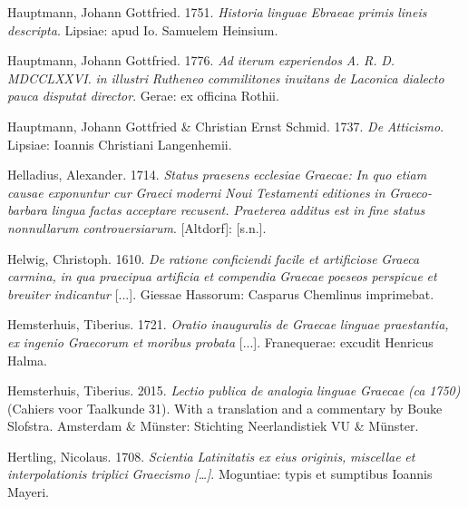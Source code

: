 Hauptmann, Johann Gottfried. 1751. \textit{Historia} \textit{linguae} \textit{Ebraeae} \textit{primis} \textit{lineis} \textit{descripta}. Lipsiae: apud Io. Samuelem Heinsium.

Hauptmann, Johann Gottfried. 1776. \textit{Ad} \textit{iterum} \textit{experiendos} \textit{A.} \textit{R.} \textit{D.} \textit{MDCCLXXVI.} \textit{in} \textit{illustri} \textit{Rutheneo} \textit{commilitones} \textit{inuitans} \textit{de} \textit{Laconica} \textit{dialecto} \textit{pauca} \textit{disputat} \textit{director}. Gerae: ex officina Rothii.

Hauptmann, Johann Gottfried \& Christian Ernst Schmid. 1737. \textit{De} \textit{Atticismo}. Lipsiae: Ioannis Christiani Langenhemii.

Helladius, Alexander. 1714. \textit{Status} \textit{praesens} \textit{ecclesiae} \textit{Graecae:} \textit{In} \textit{quo} \textit{etiam} \textit{causae} \textit{exponuntur} \textit{cur} \textit{Graeci} \textit{moderni} \textit{Noui} \textit{Testamenti} \textit{editiones} \textit{in} \textit{Graeco-barbara} \textit{lingua} \textit{factas} \textit{acceptare} \textit{recusent.} \textit{Praeterea} \textit{additus} \textit{est} \textit{in} \textit{fine} \textit{status} \textit{nonnullarum} \textit{controuersiarum}. [Altdorf]: [s.n.].

Helwig, Christoph. 1610. \textit{De} \textit{ratione} \textit{conficiendi} \textit{facile} \textit{et} \textit{artificiose} \textit{Graeca} \textit{carmina,} \textit{in} \textit{qua} \textit{praecipua} \textit{artificia} \textit{et} \textit{compendia} \textit{Graecae} \textit{poeseos} \textit{perspicue} \textit{et} \textit{breuiter} \textit{indicantur} [...]. Giessae Hassorum: Casparus Chemlinus imprimebat.

Hemsterhuis, Tiberius. 1721. \textit{Oratio} \textit{inauguralis} \textit{de} \textit{Graecae} \textit{linguae} \textit{praestantia,} \textit{ex} \textit{ingenio} \textit{Graecorum} \textit{et} \textit{moribus} \textit{probata} [...]. Franequerae: excudit Henricus Halma.

Hemsterhuis, Tiberius. 2015. \textit{Lectio} \textit{publica} \textit{de} \textit{analogia} \textit{linguae} \textit{Graecae} \textit{(ca} \textit{1750)} (Cahiers voor Taalkunde 31). With a translation and a commentary by Bouke Slofstra. Amsterdam \& Münster: Stichting Neerlandistiek VU \& Münster.

Hertling, Nicolaus. 1708. \textit{Scientia} \textit{Latinitatis} \textit{ex} \textit{eius} \textit{originis,} \textit{miscellae} \textit{et} \textit{interpolationis} \textit{triplici} \textit{Graecismo} \textit{[…]}. Moguntiae: typis et sumptibus Ioannis Mayeri.

